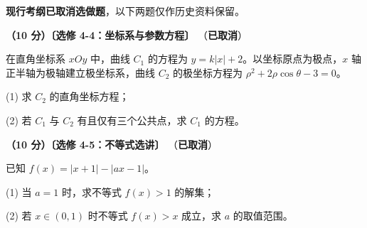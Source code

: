 \begin{gktip}
\textbf{ 现行考纲已取消选做题}，以下两题仅作历史资料保留。
\end{gktip}

\begin{question}
\textbf{（10 分）〔选修 4-4：坐标系与参数方程〕} （\textbf{已取消}）

在直角坐标系 $xOy$ 中，曲线 $C_1$ 的方程为 $y=k|x|+2$。以坐标原点为极点，$x$ 轴正半轴为极轴建立极坐标系，曲线 $C_2$ 的极坐标方程为 $\rho^{2}+2\rho\cos\theta-3=0$。

  (1) 求 $C_2$ 的直角坐标方程；

  (2) 若 $C_1$ 与 $C_2$ 有且仅有三个公共点，求 $C_1$ 的方程。

\end{question}
\begingroup
\renewenvironment{question}{\Needspace{0.08\textheight}}{}
\begin{question}
\textbf{（10 分）〔选修 4-5：不等式选讲〕} （\textbf{已取消}）

已知 $f(x)=|x+1|-|ax-1|$。

  (1) 当 $a=1$ 时，求不等式 $f(x)>1$ 的解集；

  (2) 若 $x\in(0,1)$ 时不等式 $f(x)>x$ 成立，求 $a$ 的取值范围。

\par\medskip


\end{question}
\endgroup